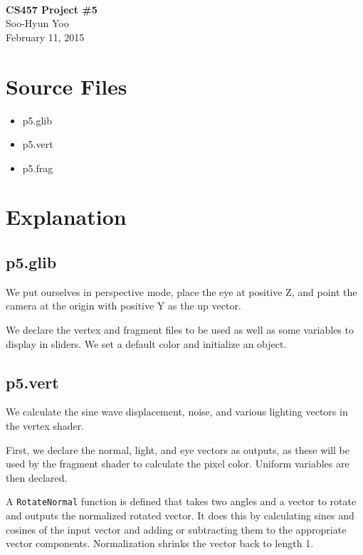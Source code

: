 \documentclass[12pt,letterpaper]{article}
\begin{document}
\fancyfoot{}
\begin{center}
    \hfill \\
    \vspace{4in}
    {\bf\Huge CS457 Project \#5 \\}
    \vspace{2in}
    {\Large Soo-Hyun Yoo \\ February 11, 2015}
\end{center}

\newpage
{}

\section*{Source Files}

\begin{itemize}
    \item p5.glib
    \item p5.vert
    \item p5.frag
\end{itemize}


\section*{Explanation}

\subsection*{p5.glib}

We put ourselves in perspective mode, place the eye at positive Z, and point
the camera at the origin with positive Y as the up vector.

We declare the vertex and fragment files to be used as well as some variables
to display in sliders. We set a default color and initialize an object.

\subsection*{p5.vert}

We calculate the sine wave displacement, noise, and various lighting vectors in
the vertex shader.

First, we declare the normal, light, and eye vectors as outputs, as these will
be used by the fragment shader to calculate the pixel color. Uniform variables
are then declared.

A {\tt RotateNormal} function is defined that takes two angles and a vector to
rotate and outputs the normalized rotated vector. It does this by calculating
sines and cosines of the input vector and adding or subtracting them to the
appropriate vector components. Normalization shrinks the vector back to length
1.
\end{document}
